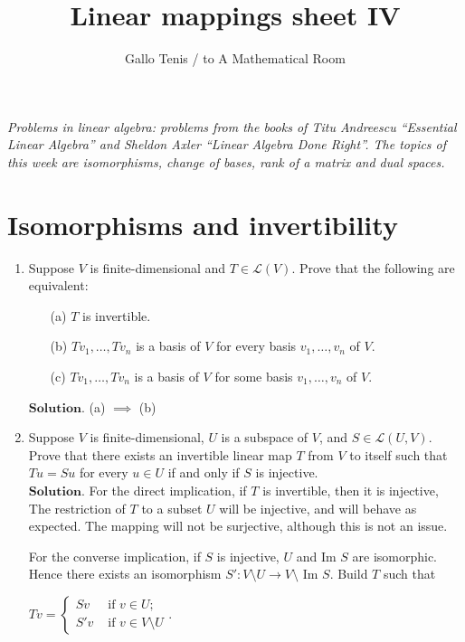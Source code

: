 \documentclass{article}
\title{Linear mappings sheet IV}
\author{Gallo Tenis / to A Mathematical Room}
\theoremstyle{remark}
\begin{document}
\maketitle

\begin{center}
    \textit{Problems in linear algebra: problems from the books of Titu Andreescu ``Essential Linear Algebra'' and
    Sheldon Axler ``Linear Algebra Done Right''. The topics of this week are
    isomorphisms, change of bases, rank of a matrix and dual spaces.
    }
\end{center}
\section*{Isomorphisms and invertibility}
\begin{enumerate}
        \item Suppose $V$ is finite-dimensional and $T \in \mathcal{L}(V)$. Prove that the following are equivalent:

        \begin{enumerate}
            \item[(a)] $T$ is invertible.
            \item[(b)] $T v_1, \dots, T v_n$ is a basis of $V$ for every basis $v_1, \dots, v_n$ of $V$.
            \item[(c)] $T v_1, \dots, T v_n$ is a basis of $V$ for some basis $v_1, \dots, v_n$ of $V$.
        \end{enumerate}
        $\textbf{Solution.}$
        (a) $\implies$ (b)
        \item Suppose $V$ is finite-dimensional, $U$ is a subspace of $V$, and $S \in \mathcal{L}(U, V)$. 
        Prove that there exists an invertible linear map $T$ from $V$ to itself such that $T u = S u$ for every $u \in U$ 
        if and only if $S$ is injective.\\
        $\textbf{Solution.}$ For the direct implication, if $T$ is invertible, then it is injective,
        The restriction of $T$ to a subset $U$ will be injective, and will behave as expected.
        The mapping will not be surjective, although this is not an issue.
        
        For the converse implication, if $S$ is injective, 
        $U$ and Im $S$ are isomorphic.
        Hence there exists an isomorphism $S':V\setminus U \to V\setminus$ Im $S$.
        Build $T$ such that
        \begin{center}
            $Tv =
            \begin{cases}
                Sv & \text{ if } v\in U; \\
                S'v & \text{ if } v\in V\setminus U
            \end{cases}$.
        \end{center}


\end{enumerate}
\end{document}
